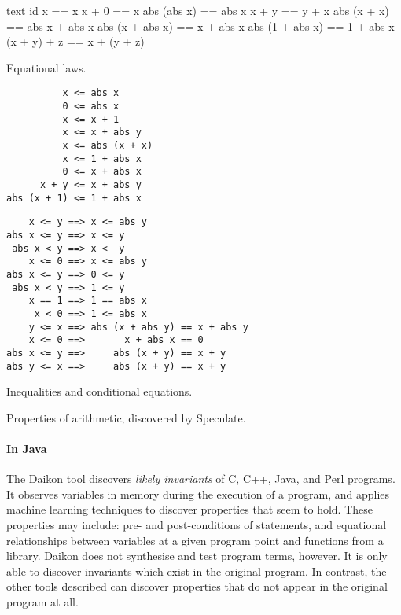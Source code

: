\begin{listing}
\begin{sublisting}{\textwidth}
\centering
\begin{cminted}{text}
           id x == x
          x + 0 == x
    abs (abs x) == abs x
          x + y == y + x
    abs (x + x) == abs x + abs x
abs (x + abs x) == x + abs x
abs (1 + abs x) == 1 + abs x
    (x + y) + z == x + (y + z)
\end{cminted}
\caption{Equational laws.}\label{lst:arith_props0}
\end{sublisting}

\vspace{2.5em}

\begin{sublisting}{\textwidth}
\begin{minipage}[t]{0.45\textwidth}
\begin{verbatim}
          x <= abs x
          0 <= abs x
          x <= x + 1
          x <= x + abs y
          x <= abs (x + x)
          x <= 1 + abs x
          0 <= x + abs x
      x + y <= x + abs y
abs (x + 1) <= 1 + abs x
\end{verbatim}
\end{minipage}
\begin{minipage}[t]{0.55\textwidth}
\begin{verbatim}
    x <= y ==> x <= abs y
abs x <= y ==> x <= y
 abs x < y ==> x <  y
    x <= 0 ==> x <= abs y
abs x <= y ==> 0 <= y
 abs x < y ==> 1 <= y
    x == 1 ==> 1 == abs x
     x < 0 ==> 1 <= abs x
    y <= x ==> abs (x + abs y) == x + abs y
    x <= 0 ==>       x + abs x == 0
abs x <= y ==>     abs (x + y) == x + y
abs y <= x ==>     abs (x + y) == x + y
\end{verbatim}
\end{minipage}
\caption{Inequalities and conditional equations.}\label{lst:arith_props1}
\end{sublisting}
\caption{Properties of arithmetic, discovered by Speculate.}\label{lst:arith_props}
\end{listing}

\paragraph{In Java}
The Daikon\cite{ernst2007} tool discovers \emph{likely invariants} of
C, C++, Java, and Perl programs.  It observes variables in memory
during the execution of a program, and applies machine learning
techniques to discover properties that seem to hold.  These properties
may include: pre- and post-conditions of statements, and equational
relationships between variables at a given program point and functions
from a library.  Daikon does not synthesise and test program terms,
however.  It is only able to discover invariants which exist in the
original program.  In contrast, the other tools described can discover
properties that do not appear in the original program at all.

